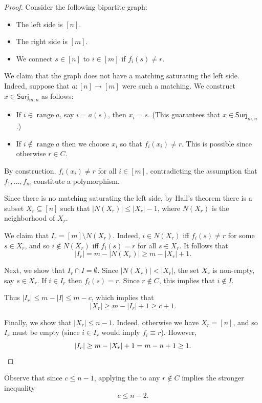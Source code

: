\documentclass{article}
\providecommand{\Surj}{\mathsf{Surj}}
\DeclareMathOperator{\range}{range}
\theoremstyle{definition}
\theoremstyle{remark}
\begin{document}
\begin{proof}
Consider the following bipartite graph:
\begin{itemize}
\item The left side is $[n]$.
\item The right side is $[m]$.
\item We connect $s \in [n]$ to $i \in [m]$ if $f_i(s) \neq r$.
\end{itemize}

We claim that the graph does not have a matching saturating the left side. Indeed, suppose that $a\colon [n] \to [m]$ were such a matching. We construct $x \in \Surj_{m,n}$ as follows:
\begin{itemize}
\item If $i \in \range a$, say $i = a(s)$, then $x_i = s$. (This guarantees that $x \in \Surj_{m,n}$.)
\item If $i \notin \range a$ then we choose $x_i$ so that $f_i(x_i) \neq r$. This is possible since otherwise $r \in C$.
\end{itemize}
By construction, $f_i(x_i) \neq r$ for all $i \in [m]$, contradicting the assumption that $f_1,\dots,f_m$ constitute a polymorphism.

Since there is no matching saturating the left side, by Hall's theorem there is a subset $X_r \subseteq [n]$ such that $|N(X_r)| \leq |X_r| - 1$, where $N(X_r)$ is the neighborhood of $X_r$.

We claim that $I_r = [m] \setminus N(X_r)$. Indeed, $i \in N(X_r)$ iff $f_i(s) \neq r$ for some $s \in X_r$, and so $i \notin N(X_r)$ iff $f_i(s) = r$ for all $s \in X_r$. It follows that
\[
 |I_r| = m - |N(X_r)| \ge m - |X_r| + 1.
\]

Next, we show that $I_r \cap I = \emptyset$. Since $|N(X_r)| < |X_r|$, the set $X_r$ is non-empty, say $s \in X_r$. If $i \in I_r$ then $f_i(s) = r$. Since $r \notin C$, this implies that $i \notin I$.

Thus $|I_r| \leq m - |I| \leq m - c$, which implies that
\[
 |X_r| \ge m - |I_r| + 1 \ge c + 1.
\]

Finally, we show that $|X_r| \leq n - 1$. Indeed, otherwise we have $X_r = [n]$, and so $I_r$ must be empty (since $i \in I_r$ would imply $f_i \equiv r$). However,
\[
 |I_r| \ge m - |X_r| + 1 = m - n + 1 \geq 1. \qedhere
\]
\end{proof}

Observe that since $c \leq n - 1$, applying the  to any $r \notin C$ implies the stronger inequality
\[
 c \leq n - 2.
\]
\end{document}
